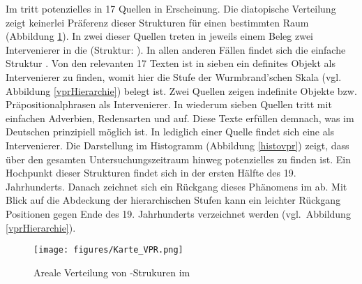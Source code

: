  Im  tritt potenzielles \hai{{\VPR}} in 17 Quellen in Erscheinung. Die diatopische Verteilung zeigt keinerlei Präferenz dieser Strukturen für einen bestimmten Raum (Abbildung \ref{KarteVPR}). In zwei dieser Quellen treten in jeweils einem Beleg zwei Intervenierer  in die  (Struktur:  ). In allen anderen Fällen findet sich die einfache Struktur  . Von den relevanten 17 Texten ist in sieben ein definites Objekt als Intervenierer zu finden, womit hier die  Stufe der Wurmbrand'schen Skala (vgl.\, Abbildung \ref{vprHierarchie}) belegt ist. Zwei Quellen zeigen indefinite Objekte bzw. Präpositionalphrasen als  Intervenierer. In wiederum sieben Quellen tritt \hai{{\VPR}} mit einfachen Adverbien, Redensarten und  auf. Diese Texte erfüllen demnach, was im Deutschen prinzipiell möglich ist. In lediglich einer Quelle findet sich eine  als Intervenierer. Die Darstellung im Histogramm (Abbildung \ref{histovpr}) zeigt, dass über den gesamten Untersuchungszeitraum hinweg potenzielles \hai{{\VPR}} zu finden ist. Ein Hochpunkt dieser Strukturen findet sich in der ersten Hälfte des 19. Jahrhunderts. Danach zeichnet sich ein Rückgang dieses Phänomens im  ab. Mit Blick auf die Abdeckung der hierarchischen Stufen kann ein leichter Rückgang  Positionen gegen Ende des 19. Jahrhunderts verzeichnet werden (vgl.\, Abbildung \ref{vprHierarchie}). 
     
     
     
     
     \begin{figure}
 
\texttt{[image: figures/Karte\_VPR.png]}
		\caption{\label{KarteVPR} Areale Verteilung von \hai{{\VPR}}-Strukuren im }
	\end{figure}
     
     
     
